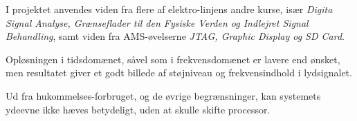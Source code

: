 I projektet anvendes viden fra flere af elektro-linjens andre kurse, især \textit{Digita Signal Analyse, Grænseflader til den Fysiske Verden og Indlejret Signal Behandling}, samt viden fra AMS-øvelserne \textit{JTAG, Graphic Display og SD Card}.

Opløsningen i tidsdomænet, såvel som i frekvensdomænet er lavere end ønsket, men resultatet giver et godt billede af støjniveau og frekvensindhold i lydsignalet. 

Ud fra hukommelses-forbruget, og de øvrige begrænsninger, kan systemets ydeevne ikke hæves betydeligt, uden at skulle skifte processor. 
 
